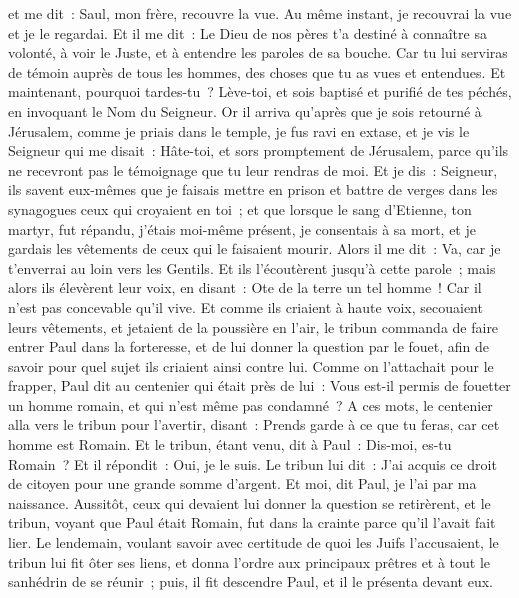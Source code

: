 \begin{multicols}{2}
et me dit~: Saul, mon frère, recouvre la vue. Au même instant, je recouvrai la vue et je le regardai.
Et il me dit~: Le Dieu de nos pères t'a destiné à connaître sa volonté, à voir le Juste, et à entendre les paroles de sa bouche.
Car tu lui serviras de témoin auprès de tous les hommes, des choses que tu as vues et entendues.
Et maintenant, pourquoi tardes-tu~? Lève-toi, et sois baptisé et purifié de tes péchés, en invoquant le Nom du Seigneur.
Or il arriva qu'après que je sois retourné à Jérusalem, comme je priais dans le temple, je fus ravi en extase,
et je vis le Seigneur qui me disait~: Hâte-toi, et sors promptement de Jérusalem, parce qu'ils ne recevront pas le témoignage que tu leur rendras de moi.
Et je dis~: Seigneur, ils savent eux-mêmes que je faisais mettre en prison et battre de verges dans les synagogues ceux qui croyaient en toi~;
et que lorsque le sang d'Etienne, ton martyr, fut répandu, j'étais moi-même présent, je consentais à sa mort, et je gardais les vêtements de ceux qui le faisaient mourir.
Alors il me dit~: Va, car je t'enverrai au loin vers les Gentils.
Et ils l'écoutèrent jusqu'à cette parole~; mais alors ils élevèrent leur voix, en disant~: Ote de la terre un tel homme~! Car il n'est pas concevable qu'il vive.
Et comme ils criaient à haute voix, secouaient leurs vêtements, et jetaient de la poussière en l'air,
le tribun commanda de faire entrer Paul dans la forteresse, et de lui donner la question par le fouet, afin de savoir pour quel sujet ils criaient ainsi contre lui.
Comme on l'attachait pour le frapper, Paul dit au centenier qui était près de lui~: Vous est-il permis de fouetter un homme romain, et qui n'est même pas condamné~?
A ces mots, le centenier alla vers le tribun pour l'avertir, disant~: Prends garde à ce que tu feras, car cet homme est Romain.
Et le tribun, étant venu, dit à Paul~: Dis-moi, es-tu Romain~? Et il répondit~: Oui, je le suis.
Le tribun lui dit~: J'ai acquis ce droit de citoyen pour une grande somme d'argent. Et moi, dit Paul, je l'ai par ma naissance.
Aussitôt, ceux qui devaient lui donner la question se retirèrent, et le tribun, voyant que Paul était Romain, fut dans la crainte parce qu'il l'avait fait lier.
Le lendemain, voulant savoir avec certitude de quoi les Juifs l'accusaient, le tribun lui fit ôter ses liens, et donna l'ordre aux principaux prêtres et à tout le sanhédrin de se réunir~; puis, il fit descendre Paul, et il le présenta devant eux.

\end{multicols}
